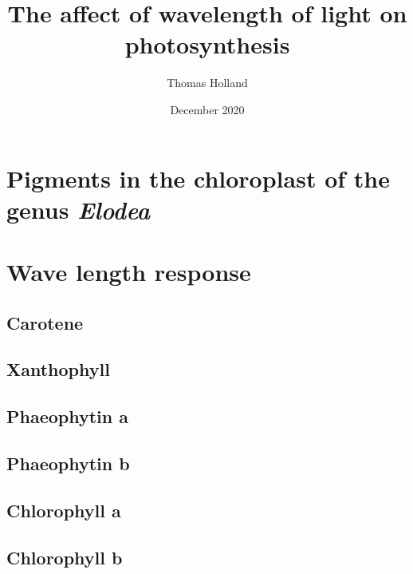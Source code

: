\documentclass[11pt]{article}
\title{The affect of wavelength of light on photosynthesis}
\author{Thomas Holland}
\date{December 2020}
\begin{document}
\maketitle

\section{Pigments in the chloroplast of the genus \textit{Elodea}}

\section{Wave length response}
\subsection{Carotene}

\subsection{Xanthophyll}

\subsection{Phaeophytin a}

\subsection{Phaeophytin b}

\subsection{Chlorophyll a}

\subsection{Chlorophyll b}





\end{document}
